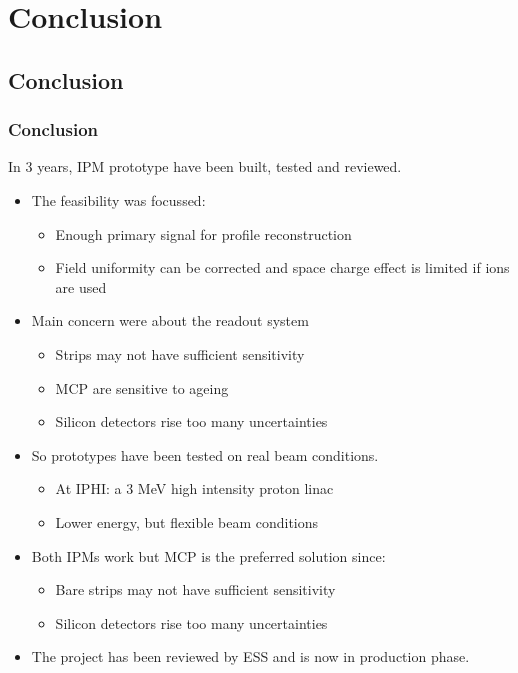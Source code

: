 \section{Conclusion}

\subsection{Conclusion}
\begin{frame}
  \frametitle{Conclusion}
  \begin{block}{In 3 years, IPM prototype have been built, tested and reviewed.}
    \begin{itemize}
      \item The feasibility was focussed:
            \begin{itemize}
              \item Enough primary signal for profile reconstruction
              \item Field uniformity can be corrected and space charge effect is limited if ions are used
            \end{itemize}
      \item Main concern were about the readout system
            \begin{itemize}
              \item Strips may not have sufficient sensitivity
              \item MCP are sensitive to ageing
              \item Silicon detectors rise too many uncertainties
            \end{itemize}
      \item So prototypes have been tested on real beam conditions.
            \begin{itemize}
              \item At IPHI: a 3 MeV high intensity proton linac
              \item Lower energy, but flexible beam conditions
            \end{itemize}
      \item Both IPMs work but MCP is the preferred solution since:
            \begin{itemize}
              \item Bare strips may not have sufficient sensitivity
              \item Silicon detectors rise too many uncertainties
            \end{itemize}
      \item The project has been reviewed by ESS and is now in production phase.
    \end{itemize}
  \end{block}

\end{frame}

